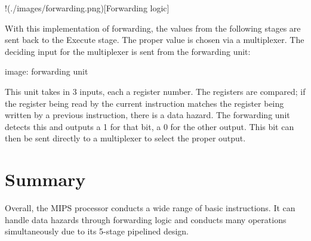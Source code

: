 !(./images/forwarding.png){[}Forwarding logic{]}

With this implementation of forwarding, the values from the following
stages are sent back to the Execute stage. The proper value is chosen
via a multiplexer. The deciding input for the multiplexer is sent from
the forwarding unit:

image: forwarding unit

This unit takes in 3 inputs, each a register number. The registers are
compared; if the register being read by the current instruction matches
the register being written by a previous instruction, there is a data
hazard. The forwarding unit detects this and outputs a 1 for that bit, a
0 for the other output. This bit can then be sent directly to a
multiplexer to select the proper output.

\section{Summary}\label{summary}

Overall, the MIPS processor conducts a wide range of basic instructions.
It can handle data hazards through forwarding logic and conducts many
operations simultaneously due to its 5-stage pipelined design.
